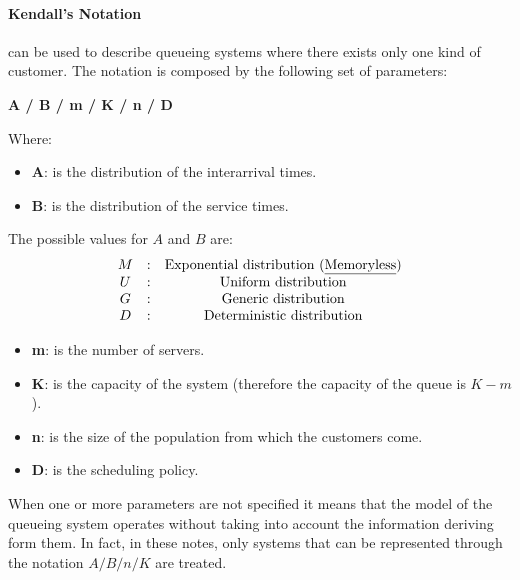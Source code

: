 \documentclass[12pt,a4paper]{article}
\begin{document}
\paragraph{Kendall's Notation} can be used to describe queueing systems where there exists only one kind of customer. 
The notation is composed by the following set of parameters:
\begin{center}
\textbf{A / B / m / K / n / D}
\end{center}

\noindent
Where:
\begin{itemize}
\item \textbf{A}: is the distribution of the interarrival times.
\item \textbf{B}: is the distribution of the service times.
\end{itemize}
The possible values for $A$ and $B$ are:
$$
\begin{matrix}
M & : & \textrm{Exponential distribution (\underline{Memoryless})} \cr
U & : & \textrm{Uniform distribution} \cr
G & : & \textrm{Generic distribution} \cr
D & : & \textrm{Deterministic distribution}
\end{matrix}
$$
\begin{itemize}
\item \textbf{m}: is the number of servers.
\item \textbf{K}: is the capacity of the system (therefore the capacity of the queue is $K-m$).
\item \textbf{n}: is the size of the population from which the customers come.
\item \textbf{D}: is the scheduling policy.
\end{itemize}
When one or more parameters are not specified it means that the model of the queueing system operates without taking into account the information deriving form them. In fact, in these notes, only systems that can be represented through the notation
$A/B/n/K$ are treated.
\end{document}
